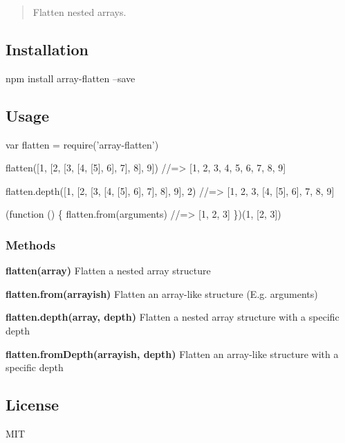 \href{https://npmjs.org/package/array-flatten}{\tt } \href{https://npmjs.org/package/array-flatten}{\tt } \href{https://travis-ci.org/blakeembrey/array-flatten}{\tt } \href{https://coveralls.io/r/blakeembrey/array-flatten?branch=master}{\tt }

\begin{quote}
Flatten nested arrays. \end{quote}


\subsection*{Installation}


\begin{DoxyCode}
npm install array-flatten --save
\end{DoxyCode}


\subsection*{Usage}


\begin{DoxyCode}
var flatten = require('array-flatten')

flatten([1, [2, [3, [4, [5], 6], 7], 8], 9])
//=> [1, 2, 3, 4, 5, 6, 7, 8, 9]

flatten.depth([1, [2, [3, [4, [5], 6], 7], 8], 9], 2)
//=> [1, 2, 3, [4, [5], 6], 7, 8, 9]

(function () \{
  flatten.from(arguments) //=> [1, 2, 3]
\})(1, [2, 3])
\end{DoxyCode}


\subsubsection*{Methods}


\begin{DoxyItemize}
\item {\bfseries flatten(array)} Flatten a nested array structure
\item {\bfseries flatten.\+from(arrayish)} Flatten an array-\/like structure (E.\+g. arguments)
\item {\bfseries flatten.\+depth(array, depth)} Flatten a nested array structure with a specific depth
\item {\bfseries flatten.\+from\+Depth(arrayish, depth)} Flatten an array-\/like structure with a specific depth
\end{DoxyItemize}

\subsection*{License}

M\+IT 